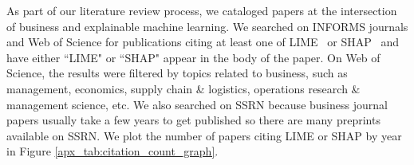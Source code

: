 \documentclass[mnsc,blindrev]{informs3}
\begin{document}
       
        As part of our literature review process, we cataloged papers at the intersection of business and explainable machine learning. We searched on INFORMS journals and Web of Science for publications citing at least one of LIME~\citep{ribeiro16lime} or SHAP~\citep{lundberg17shap} and have either ``LIME" or ``SHAP" appear in the body of the paper. On Web of Science, the results were filtered by topics related to business, such as management, economics, supply chain \& logistics, operations research \& management science, etc. We also searched on SSRN because business journal papers usually take a few years to get published so there are many preprints available on SSRN.  We plot the number of papers citing LIME or SHAP by year in Figure \ref{apx_tab:citation_count_graph}. %

        
\end{document}
